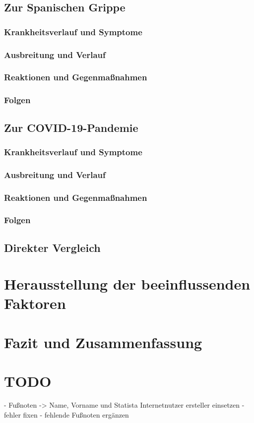 \documentclass[12pt]{article}
\begin{document}
\subsection{Zur Spanischen Grippe}
\subsubsection{Krankheitsverlauf und Symptome}
\subsubsection{Ausbreitung und Verlauf}
\subsubsection{Reaktionen und Gegenmaßnahmen}
\subsubsection{Folgen}
\subsection{Zur COVID-19-Pandemie}
\subsubsection{Krankheitsverlauf und Symptome}
\subsubsection{Ausbreitung und Verlauf}
\subsubsection{Reaktionen und Gegenmaßnahmen}
\subsubsection{Folgen}
\subsection{Direkter Vergleich }
\section{Herausstellung der beeinflussenden Faktoren}
\section{Fazit und Zusammenfassung}
\section{TODO}
- Fußnoten -> Name, Vorname und Statista Internetnutzer ersteller einsetzen
- fehler fixen
- fehlende Fußnoten ergänzen
\end{document}
